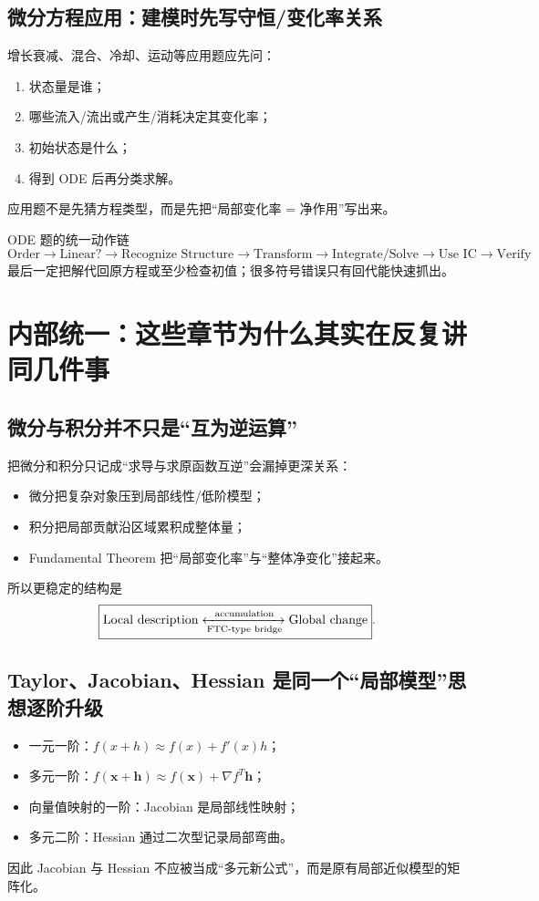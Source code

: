 \documentclass[11pt,a4paper,openany]{ctexbook}
\begin{document}
\section{微分方程应用：建模时先写守恒/变化率关系}
增长衰减、混合、冷却、运动等应用题应先问：
\begin{enumerate}
  \item 状态量是谁；
  \item 哪些流入/流出或产生/消耗决定其变化率；
  \item 初始状态是什么；
  \item 得到 ODE 后再分类求解。
\end{enumerate}
应用题不是先猜方程类型，而是先把“局部变化率 = 净作用”写出来。

\begin{examBox}{ODE 题的统一动作链}
\[
\boxed{\text{Order}\to\text{Linear?}\to\text{Recognize Structure}\to\text{Transform}\to\text{Integrate/Solve}\to\text{Use IC}\to\text{Verify}}
\]
最后一定把解代回原方程或至少检查初值；很多符号错误只有回代能快速抓出。
\end{examBox}

\chapter{内部统一：这些章节为什么其实在反复讲同几件事}

\section{微分与积分并不只是“互为逆运算”}
把微分和积分只记成“求导与求原函数互逆”会漏掉更深关系：
\begin{itemize}
  \item 微分把复杂对象压到局部线性/低阶模型；
  \item 积分把局部贡献沿区域累积成整体量；
  \item Fundamental Theorem 把“局部变化率”与“整体净变化”接起来。
\end{itemize}
所以更稳定的结构是
\[
\boxed{\text{Local description}\xleftrightarrow[\text{FTC-type bridge}]{\text{accumulation}}\text{Global change}}.
\]

\section{Taylor、Jacobian、Hessian 是同一个“局部模型”思想逐阶升级}
\begin{itemize}
  \item 一元一阶：$f(x+h)\approx f(x)+f'(x)h$；
  \item 多元一阶：$f(\bm x+\bm h)\approx f(\bm x)+\nabla f^T\bm h$；
  \item 向量值映射的一阶：Jacobian 是局部线性映射；
  \item 多元二阶：Hessian 通过二次型记录局部弯曲。
\end{itemize}
因此 Jacobian 与 Hessian 不应被当成“多元新公式”，而是原有局部近似模型的矩阵化。
\end{document}
